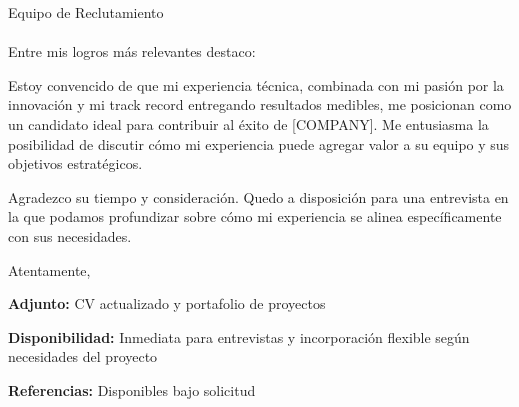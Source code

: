\documentclass[11pt,letterpaper]{letter}
\newcommand{\TARGETCOMPANY}{[COMPANY]}
\newcommand{\TARGETPOSITION}{[POSITION]}
\newcommand{\HIRINGMANAGER}{[HIRING_MANAGER]}
\newcommand{\COVERLETTERTEMPLATE}{[TEMPLATE]}
\begin{document}
\begin{letter}{
    Equipo de Reclutamiento \\
    \TARGETCOMPANY \\
    \HIRINGMANAGER
}
Entre mis logros más relevantes destaco:



Estoy convencido de que mi experiencia técnica, combinada con mi pasión por la innovación y mi track record entregando resultados medibles, me posicionan como un candidato ideal para contribuir al éxito de \TARGETCOMPANY. Me entusiasma la posibilidad de discutir cómo mi experiencia puede agregar valor a su equipo y sus objetivos estratégicos.

Agradezco su tiempo y consideración. Quedo a disposición para una entrevista en la que podamos profundizar sobre cómo mi experiencia se alinea específicamente con sus necesidades.

\closing{Atentamente,}

\vspace{1cm}


\textbf{Adjunto:} CV actualizado y portafolio de proyectos

\textbf{Disponibilidad:} Inmediata para entrevistas y incorporación flexible según necesidades del proyecto

\textbf{Referencias:} Disponibles bajo solicitud

\end{letter}

\end{document}

